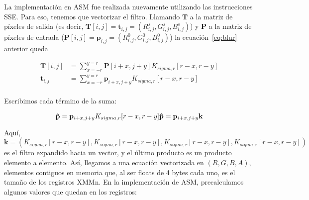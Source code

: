 La implementación en ASM fue realizada nuevamente utilizando las
instrucciones {\ttfamily SSE}. Para eso, tenemos que vectorizar el
filtro. Llamando $\mathbf{T}$ a la matriz de píxeles de salida (es decir,
$\mathbf{T}[i, j] = \mathbf{t}_{i, j} = (R^s_{i, j}, G^s_{i, j},
B^s_{i, j})$)
y $\mathbf{P}$ a la matriz de píxeles de entrada
($\mathbf{P}[i, j] = \mathbf{p}_{i, j} = (R^0_{i, j}, G^0_{i, j},
B^0_{i, j})$) la ecuación~\ref{eq:blur} anterior queda

\begin{align}
  \mathbf{T}[i, j] &= \sum_{x=-r}^{y=r} \mathbf{P}[i+x, j+y] K_{sigma,
                     r} [r-x, r-y] \\
  \mathbf{t}_{i, j} &= \sum_{x=-r}^{y=r} \mathbf{p}_{i+x, j+y} K_{sigma,
                     r}[r-x, r-y]\\
\end{align}

Escribimos cada término de la suma:

\begin{equation}
  \mathbf{\hat{p}} = \mathbf{p}_{i+x, j+y} K_{sigma, r}[r-x, r-y] \\
  \mathbf{\hat{p}} = \mathbf{p}_{i+x, j+y} \mathbf{k} 
  \label{eq:blur_vec}
\end{equation}

Aquí,
$\mathbf{k} = (K_{sigma, r}[r-x, r-y], K_{sigma, r}[r-x, r-y],
K_{sigma, r}[r-x, r-y], K_{sigma, r}[r-x, r-y])$
es el filtro expandido hacia un vector, y el último producto es un
producto elemento a elemento. Así, llegamos a una ecuación vectorizada
en $(R, G, B, A)$, elementos contiguos en memoria que, al ser floats
de 4 bytes cada uno, es el tamaño de los registros {\ttfamily
  XMMn}. En la implementación de ASM, precalculamos algunos valores
que quedan en los registros:

